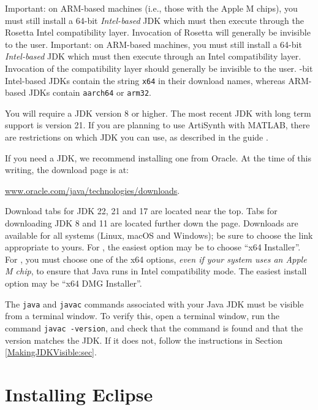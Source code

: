 \begin{sideblock}
\ifMacOS
Important: on ARM-based machines (i.e., those with the Apple M chips), you must
still install a 64-bit {\it Intel-based} JDK which must then execute through
the Rosetta Intel compatibility layer. Invocation of Rosetta will generally be
invisible to the user.
\else
Important: on ARM-based machines, you must still install a 64-bit {\it
Intel-based} JDK which must then execute through 
an Intel compatibility layer. Invocation of the compatibility layer
should generally be invisible to the user.
-bit Intel-based JDKs
contain the string {\tt x64} in their download names, whereas
ARM-based JDKs contain {\tt aarch64} or {\tt arm32}.
\end{sideblock}

You will require a JDK version 8 or higher. The most recent JDK with
long term support is version 21.  If you are planning to use
ArtiSynth with MATLAB, there are restrictions on which JDK you can use, as
described in the guide
.

If you need a JDK, we recommend installing one from Oracle.  At the time of
this writing, the download page is at:

\href{https://www.oracle.com/java/technologies/downloads/}%
{www.oracle.com/java/technologies/downloads}.

Download tabs for JDK 22, 21 and 17 are located near the top.  Tabs for
downloading JDK 8 and 11 are located further down the page.
Downloads are available for all systems ({\sf Linux}, {\sf macOS} and
{\sf Windows}); be sure to choose the link appropriate to yours.
\ifWindows
For \SYSTEM{}, the easiest option may be to choose ``{\sf x64 Installer}''.
\fi
\ifMacOS
For \SYSTEM{}, you must choose one of the {\sf x64} options,
{\it even if your system uses an Apple M chip}, to ensure
that Java runs in Intel compatibility mode. The
easiest install option may be ``{\sf x64 DMG Installer}''.
\fi

The {\tt java} and {\tt javac} commands associated with your Java
JDK must be visible from a terminal window. To verify this, open a
terminal window, run the command {\tt javac
-version}, and check that the command is found and that the version
matches the JDK.  If it does not, follow the instructions in Section
\ref{MakingJDKVisible:sec}.

\section{Installing Eclipse}

